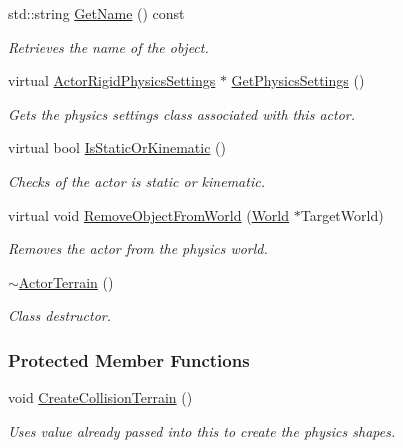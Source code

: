 \begin{DoxyCompactItemize}
std::string \hyperlink{classphys_1_1ActorTerrain_a08f306ae189e55d780dcaa2c43d7b6eb}{GetName} () const 
\begin{DoxyCompactList}\small\item\em Retrieves the name of the object. \item\end{DoxyCompactList}\item 
virtual \hyperlink{classphys_1_1ActorRigidPhysicsSettings}{ActorRigidPhysicsSettings} $\ast$ \hyperlink{classphys_1_1ActorTerrain_a4210cd05b0ec97f089fc6420e4b0bae8}{GetPhysicsSettings} ()
\begin{DoxyCompactList}\small\item\em Gets the physics settings class associated with this actor. \item\end{DoxyCompactList}\item 
virtual bool \hyperlink{classphys_1_1ActorTerrain_a37d0fb3d028ac1946e3553f7f0eef56d}{IsStaticOrKinematic} ()
\begin{DoxyCompactList}\small\item\em Checks of the actor is static or kinematic. \item\end{DoxyCompactList}\item 
virtual void \hyperlink{classphys_1_1ActorTerrain_aeded1fdabfc4dd407f81fcc5b97c1f77}{RemoveObjectFromWorld} (\hyperlink{classphys_1_1World}{World} $\ast$TargetWorld)
\begin{DoxyCompactList}\small\item\em Removes the actor from the physics world. \item\end{DoxyCompactList}\item 
\hyperlink{classphys_1_1ActorTerrain_af6ef2e3694b7afe0b59cfa0909c0490c}{$\sim$ActorTerrain} ()
\begin{DoxyCompactList}\small\item\em Class destructor. \item\end{DoxyCompactList}\end{DoxyCompactItemize}
\subsubsection*{Protected Member Functions}
\begin{DoxyCompactItemize}
\item 
\hypertarget{classphys_1_1ActorTerrain_ade758919c0f2b58ad1fe4bfd388d79af}{
void \hyperlink{classphys_1_1ActorTerrain_ade758919c0f2b58ad1fe4bfd388d79af}{CreateCollisionTerrain} ()}
\label{classphys_1_1ActorTerrain_ade758919c0f2b58ad1fe4bfd388d79af}

\begin{DoxyCompactList}\small\item\em Uses value already passed into this to create the physics shapes. \item\end{DoxyCompactList}\end{DoxyCompactItemize}
